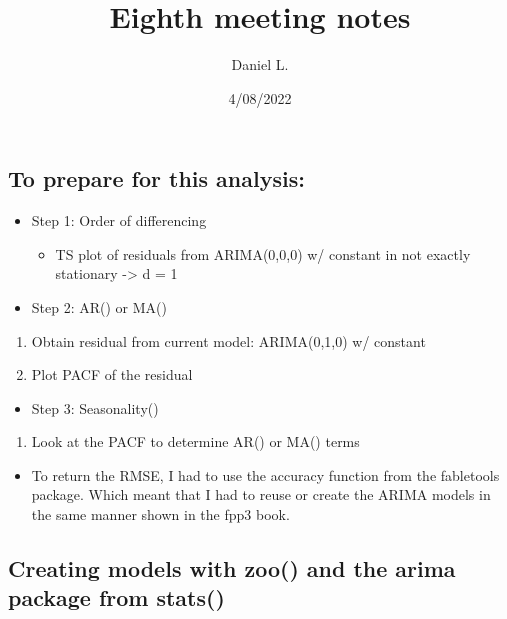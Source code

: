 \documentclass[
]{article}
\title{Eighth meeting notes}
\author{Daniel L.}
\date{4/08/2022}
\providecommand{\tightlist}{%
  \setlength{\itemsep}{0pt}\setlength{\parskip}{0pt}}
\begin{document}
\maketitle

\hypertarget{to-prepare-for-this-analysis}{%
\subsection{To prepare for this
analysis:}\label{to-prepare-for-this-analysis}}

\begin{itemize}
\tightlist
\item
  Step 1: Order of differencing

  \begin{itemize}
  \tightlist
  \item
    TS plot of residuals from ARIMA(0,0,0) w/ constant in not exactly
    stationary -\textgreater{} d = 1
  \end{itemize}
\item
  Step 2: AR() or MA()
\end{itemize}

\begin{enumerate}
\def\labelenumi{\arabic{enumi}.}
\tightlist
\item
  Obtain residual from current model: ARIMA(0,1,0) w/ constant
\item
  Plot PACF of the residual
\end{enumerate}

\begin{itemize}
\tightlist
\item
  Step 3: Seasonality()
\end{itemize}

\begin{enumerate}
\def\labelenumi{\arabic{enumi}.}
\tightlist
\item
  Look at the PACF to determine AR() or MA() terms
\end{enumerate}

\begin{itemize}
\tightlist
\item
  To return the RMSE, I had to use the accuracy function from the
  fabletools package. Which meant that I had to reuse or create the
  ARIMA models in the same manner shown in the fpp3 book.
\end{itemize}

\hypertarget{creating-models-with-zoo-and-the-arima-package-from-stats}{%
\subsection{Creating models with zoo() and the arima package from
stats()}\label{creating-models-with-zoo-and-the-arima-package-from-stats}}
\end{document}
